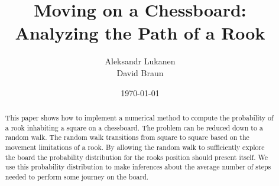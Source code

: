 \documentclass{amsart}
\numberwithin{equation}{section}
\begin{document}
\title{Moving on a Chessboard: Analyzing the Path of a Rook}
\author{Aleksandr Lukanen \\ David Braun}
\date{\today}
\maketitle

\begin{abstract}
     This paper shows how to implement a numerical method to compute the probability of a rook inhabiting a square on a chessboard. The problem can be reduced down to a random walk. The random walk transitions from square to square based on the movement limitations of a rook. By allowing the random walk to sufficiently explore the board the probability distribution for the rooks position should present itself. We use this probability distribution to make inferences about the average number of steps needed to perform some journey on the board.
\end{abstract}
\end{document}
